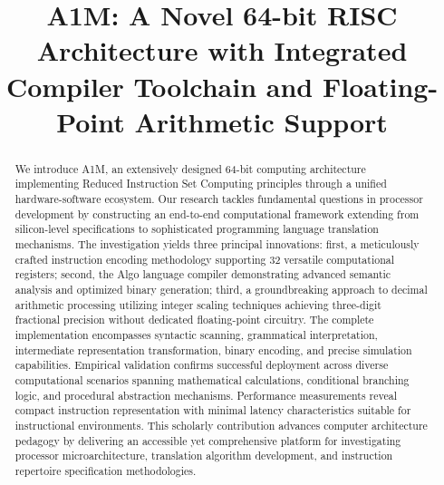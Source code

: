 \documentclass[conference,10pt,twocolumn]{IEEEtran}
\begin{document}
\title{A1M: A Novel 64-bit RISC Architecture with Integrated Compiler Toolchain and Floating-Point Arithmetic Support}

\author{
\and
{}
}

\maketitle

\begin{abstract}
We introduce A1M, an extensively designed 64-bit computing architecture implementing Reduced Instruction Set Computing principles through a unified hardware-software ecosystem. Our research tackles fundamental questions in processor development by constructing an end-to-end computational framework extending from silicon-level specifications to sophisticated programming language translation mechanisms. The investigation yields three principal innovations: first, a meticulously crafted instruction encoding methodology supporting 32 versatile computational registers; second, the Algo language compiler demonstrating advanced semantic analysis and optimized binary generation; third, a groundbreaking approach to decimal arithmetic processing utilizing integer scaling techniques achieving three-digit fractional precision without dedicated floating-point circuitry. The complete implementation encompasses syntactic scanning, grammatical interpretation, intermediate representation transformation, binary encoding, and precise simulation capabilities. Empirical validation confirms successful deployment across diverse computational scenarios spanning mathematical calculations, conditional branching logic, and procedural abstraction mechanisms. Performance measurements reveal compact instruction representation with minimal latency characteristics suitable for instructional environments. This scholarly contribution advances computer architecture pedagogy by delivering an accessible yet comprehensive platform for investigating processor microarchitecture, translation algorithm development, and instruction repertoire specification methodologies.
\end{abstract}
\end{document}
